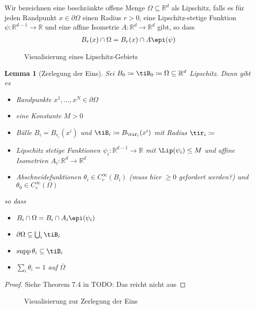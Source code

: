 \documentclass{scrartcl}
\newcounter{everything}
\newtheorem{lemma}[everything]{Lemma}
\def\R{\mathbb{R}}
\DeclareMathOperator{\supp}{supp}			%
\begin{document}
Wir bezeichnen eine beschränkte offene Menge $\Omega\subseteq\R^d$ als Lipschitz, falls es für jeden Randpunkt $x\in\partial\Omega$ einen Radius $r>0$, eine Lipschitz-stetige Funktion $\psi\colon\R^{d-1}\to\R$ und eine affine Isometrie $A\colon\R^d\to\R^d$ gibt, so dass
\begin{align*}
	B_r(x)\cap\Omega = B_r(x)\cap A\epi(\psi)
\end{align*}

\begin{figure}[h]
\centering
\hspace*{-3cm}

\caption{Visualisierung eines Lipschitz-Gebiets}
\end{figure}


\begin{lemma}[Zerlegung der Eins]
Sei $B_0\coloneqq \tiB_0\coloneqq\Omega\subseteq\R^d$ Lipschitz. Dann gibt es
\begin{itemize}
	\item
	Randpunkte $x^{1},\dots,x^{N}\in\partial\Omega$
	\item
	eine Konstante $M>0$
	\item
	Bälle $B_i=B_{r_i}(x^{i})$ und $\tiB_i\coloneqq B_{\tir_i}(x^i)$ mit Radius $\tir_i\coloneqq $
	\item
	Lipschitz stetige Funktionen $\psi_i\colon \R^{d-1}\to\R$ mit $\Lip(\psi_i)\leq M$ und affine Isometrien $A_i\colon \R^d\to\R^d$
	\item
	Abschneidefunktionen $\theta_i\in C_c^\infty(B_i)$ (muss hier $\geq0$ gefordert werden?) und $\theta_0\in C_c^\infty(\Omega)$
\end{itemize}
so dass
\begin{itemize}
	\item $B_i\cap\Omega = B_i\cap A_i\epi(\psi_i)$
	\item $\partial\Omega\subseteq\bigcup_i\tiB_i$
	\item $\supp\theta_i\subseteq \tiB_i$
	\item $\sum_i\theta_i=1$ auf $\overline{\Omega}$
\end{itemize}
\end{lemma}
\begin{proof}
	Siehe Theorem 7.4 in \cite{Con-2021}
	TODO: Das reicht nicht aus
\end{proof}
\begin{figure}[h]
\centering
\hspace*{-2cm}

\caption{Visualisierung zur Zerlegung der Eins}
\end{figure}
\end{document}
